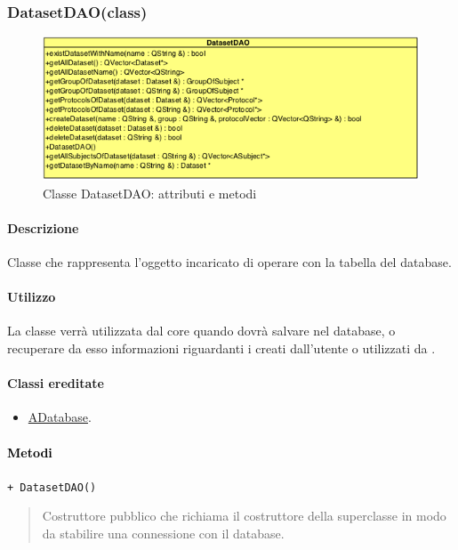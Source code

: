 \pagebreak

\subsubsection{DatasetDAO(class)}
\label{spedatasetdao}
\begin{figure}[!h]
\centering
			\includegraphics[scale=1]{./Content/Immagini/model/DatasetDAO.png}
			\caption{Classe DatasetDAO: attributi e metodi}
			\label{cl_datasetdao}
\end{figure}
\paragraph{Descrizione \\}
Classe che rappresenta l'oggetto incaricato di operare con la tabella \dataset{} del database.
\paragraph{Utilizzo\\}
La classe verrà utilizzata dal core quando dovrà salvare nel database, o recuperare da esso informazioni riguardanti i \dataset{} creati dall'utente o utilizzati da \project.
\paragraph{Classi ereditate\\}
\begin{itemize}
\item \hyperref[speadatabase]{ADatabase}.
\end{itemize}
\paragraph{\textcolor{black}{Metodi\\}}
\color{blue}\verb!+ DatasetDAO()!
\begin{quote}
\color{black} Costruttore pubblico che richiama il costruttore della superclasse in modo da stabilire una connessione con il database. \\
\end{quote}

